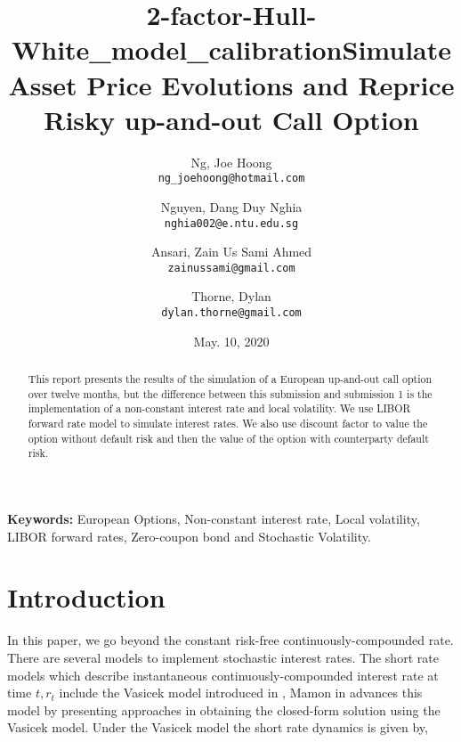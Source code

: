 \documentclass[11pt]{article}
\title{2-factor-Hull-White\_model\_calibration}
\begin{document}
\nocite{*} %

\title{Simulate Asset Price Evolutions and Reprice Risky up-and-out Call Option}

\author{
  Ng, Joe Hoong\\
  \texttt{ng\_joehoong@hotmail.com}
  \and
  Nguyen, Dang Duy Nghia \\
  \texttt{nghia002@e.ntu.edu.sg}
   \and
  Ansari, Zain Us Sami Ahmed \\
  \texttt{zainussami@gmail.com}
   \and
   Thorne, Dylan \\
  \texttt{dylan.thorne@gmail.com}
  }

\date{May. 10, 2020} %
\maketitle

\noindent
\textbf{Keywords:} European Options, Non-constant interest rate,  Local volatility, LIBOR forward rates, Zero-coupon bond and Stochastic Volatility.



\begin{abstract}
This report presents the results of the simulation of a European up-and-out call option over twelve months, but the difference between this submission and submission 1 is the implementation of a non-constant interest rate and local volatility.  We use LIBOR forward rate model to simulate interest rates.  We also use discount factor to value the option without default risk and then the value of the option with counterparty default risk.

\end{abstract}

\section{Introduction
}

In this paper, we go beyond the constant risk-free continuously-compounded rate.  There are several models to implement stochastic interest rates.  The short rate models which describe instantaneous continuously-compounded interest rate at time $t , r_t$ include the Vasicek model introduced in \cite{Vas1}, Mamon in \cite{Mamon1} advances this model by presenting approaches in obtaining the closed-form solution using the Vasicek model. Under the Vasicek model the short rate dynamics is given by,\\
\end{document}
